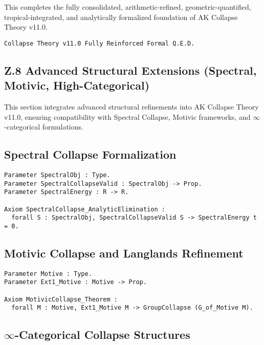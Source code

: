 \documentclass[11pt]{article}
\begin{document}
This completes the fully consolidated, arithmetic-refined, geometric-quantified, tropical-integrated, and analytically formalized foundation of AK Collapse Theory v11.0.

\begin{flushright}
\texttt{Collapse Theory v11.0 \quad Fully Reinforced \quad Formal Q.E.D.}
\end{flushright}




\subsection*{Z.8 Advanced Structural Extensions (Spectral, Motivic, High-Categorical)}

This section integrates advanced structural refinements into AK Collapse Theory v11.0, ensuring compatibility with Spectral Collapse, Motivic frameworks, and $\infty$-categorical formulations.

\subsection*{Spectral Collapse Formalization}

\begin{lstlisting}[language=Coq]
Parameter SpectralObj : Type.
Parameter SpectralCollapseValid : SpectralObj -> Prop.
Parameter SpectralEnergy : R -> R.

Axiom SpectralCollapse_AnalyticElimination :
  forall S : SpectralObj, SpectralCollapseValid S -> SpectralEnergy t = 0.
\end{lstlisting}

\subsection*{Motivic Collapse and Langlands Refinement}

\begin{lstlisting}[language=Coq]
Parameter Motive : Type.
Parameter Ext1_Motive : Motive -> Prop.

Axiom MotivicCollapse_Theorem :
  forall M : Motive, Ext1_Motive M -> GroupCollapse (G_of_Motive M).
\end{lstlisting}

\subsection*{$\infty$-Categorical Collapse Structures}
\end{document}
